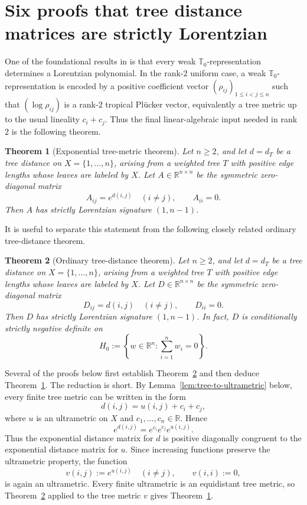 \documentclass[12pt]{amsart}
\newtheorem{theorem}{Theorem}[section]
\theoremstyle{definition}
\newcommand{\1}{\mathbf{1}}
\newcommand\R{{\mathbb R}}
\newcommand\T{{\mathbb T}}
\begin{document}
\appendix

\section{Six proofs that tree distance matrices are strictly Lorentzian}
\label{app:tree-distance-matrices}

One of the foundational results in \cite{Branden-Huh20} is that every weak
$\T_0$-representation determines a Lorentzian polynomial.  In the rank-$2$
uniform case, a weak $\T_0$-representation is encoded by a positive coefficient
vector $(\rho_{ij})_{1\le i<j\le n}$ such that $(\log \rho_{ij})$ is a rank-$2$
tropical Pl\"ucker vector, equivalently a tree metric up to the usual lineality
$c_i+c_j$.  Thus the final linear-algebraic input needed in rank $2$ is the
following theorem.

\begin{theorem}[Exponential tree-metric theorem]
\label{thm:exp-tree-Lorentzian}
Let $n\ge 2$, and let $d=d_T$ be a tree distance on $X=\{1,\dots,n\}$, arising from a weighted
tree $T$ with positive edge lengths whose leaves are labeled by $X$.  Let
$A\in \R^{n\times n}$ be the symmetric zero-diagonal matrix
\[
A_{ij}=e^{d(i,j)}\quad (i\neq j),
\qquad
A_{ii}=0.
\]
Then $A$ has strictly Lorentzian signature $(1,n-1)$.
\end{theorem}

It is useful to separate this statement from the following closely related ordinary
tree-distance theorem.

\begin{theorem}[Ordinary tree-distance theorem]
\label{thm:tree-distance-Lorentzian}
Let $n\ge 2$, and let $d=d_T$ be a tree distance on $X=\{1,\dots,n\}$, arising from a weighted
tree $T$ with positive edge lengths whose leaves are labeled by $X$.  Let
$D\in \R^{n\times n}$ be the symmetric zero-diagonal matrix
\[
D_{ij}=d(i,j)\quad (i\neq j),
\qquad
D_{ii}=0.
\]
Then $D$ has strictly Lorentzian signature $(1,n-1)$.  In fact, $D$ is
conditionally strictly negative definite on
\[
H_0:=\left\{w\in \R^n: \sum_{i=1}^n w_i=0\right\}.
\]
\end{theorem}

Several of the proofs below first establish
Theorem~\ref{thm:tree-distance-Lorentzian} and then deduce
Theorem~\ref{thm:exp-tree-Lorentzian}.  The reduction is short.  By
Lemma~\ref{lem:tree-to-ultrametric} below, every finite tree metric can be written in
the form
\[
d(i,j)=u(i,j)+c_i+c_j,
\]
where $u$ is an ultrametric on $X$ and $c_1,\dots,c_n\in\R$.  Hence
\[
e^{d(i,j)}=e^{c_i}e^{c_j}e^{u(i,j)}.
\]
Thus the exponential distance matrix for $d$ is positive diagonally congruent to
the exponential distance matrix for $u$.  Since increasing functions preserve the
ultrametric property, the function
\[
v(i,j):=e^{u(i,j)}\quad (i\neq j), \qquad v(i,i):=0,
\]
is again an ultrametric.  Every finite ultrametric is an equidistant tree metric, so
Theorem~\ref{thm:tree-distance-Lorentzian} applied to the tree metric $v$ gives
Theorem~\ref{thm:exp-tree-Lorentzian}.
\end{document}
